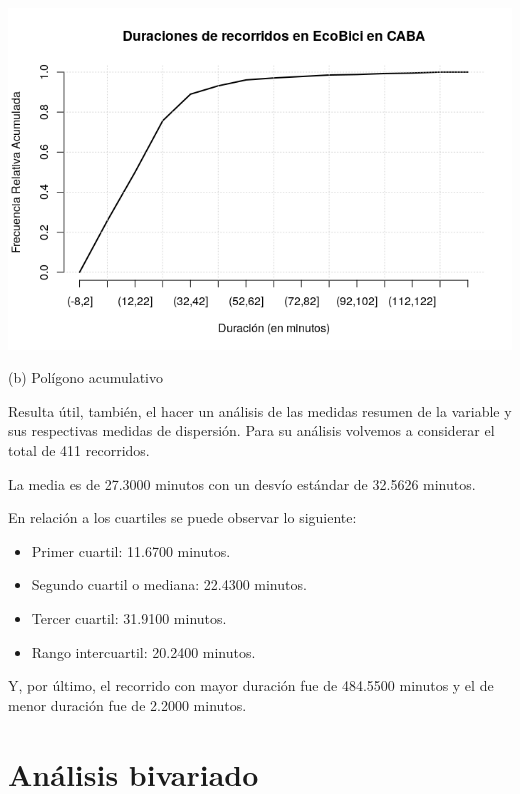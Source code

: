 \documentclass[11pt]{article}
\begin{document}
    \begin{center}
      \includegraphics[scale=0.55]{PoligAcumDuracion.png}
      \vspace{-4mm}
  
      (b) Pol\'igono acumulativo
    \end{center}

    Resulta \'util, tambi\'en, el hacer un an\'alisis de las medidas resumen de la variable y sus respectivas medidas de dispersi\'on.
    Para su an\'alisis volvemos a considerar el total de 411 recorridos.

    La media es de 27.3000 minutos con un desv\'io est\'andar de 32.5626 minutos. 

    En relaci\'on a los cuartiles se puede observar lo siguiente:

    \begin{itemize}
      \item Primer cuartil: 11.6700 minutos.
      \item Segundo cuartil o mediana: 22.4300 minutos.
      \item Tercer cuartil: 31.9100 minutos.
      \item Rango intercuartil: 20.2400 minutos.
    \end{itemize}

    Y, por \'ultimo, el recorrido con mayor duraci\'on fue de 484.5500 minutos y el de menor duraci\'on fue de 2.2000 minutos.

    \section{An\'alisis bivariado}
\end{document}
